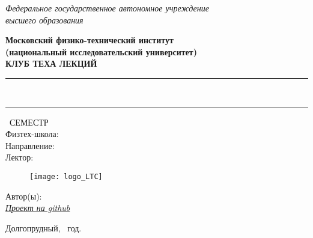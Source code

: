 \begin{titlepage}
	\clearpage\thispagestyle{empty}
	\centering
	
	\textit{Федеральное государственное автономное учреждение \\
		высшего образования}
	\vspace{0.5ex}
	
	\textbf{Московский физико-технический институт
    \\
    (национальный исследовательский университет)
    \\
     КЛУБ ТЕХА ЛЕКЦИЙ}
	\vspace{20ex}
	
	\rule{\linewidth}{0.5mm}
	{\textbf{\FullCourseNameFirstPart}}
	\\
	{\textbf{\FullCourseNameSecondPart}}
	\rule{\linewidth}{0.5mm}
	
	\SemesterNumber\ СЕМЕСТР
	\\
	Физтех-школа: \textit{\SchoolName}
	\\
	Направление: \textit{\TrackName}
	\\
	Лектор: \textit{\LecturerInitials}
	\vspace{1ex}
	
	\begin{figure}[!ht]
		\centering
		\texttt{[image: logo\_LTC]}
	\end{figure}
\begin{flushright}
	\noindent
	Автор(ы): \href{\VKLink}{\textit{\AutherInitials}}
	\\
	\href{\GithubLink}{\textit{Проект на github}} 
\end{flushright}
	
	\vfill
	Долгопрудный, \CourseDate\ год.
	\pagebreak
	
\end{titlepage}
